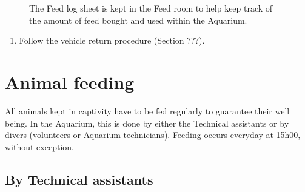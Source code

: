 \documentclass[
  12pt,
]{report}
\providecommand{\tightlist}{%
  \setlength{\itemsep}{0pt}\setlength{\parskip}{0pt}}\usepackage{longtable,booktabs,array}
\begin{document}
\begin{figure}[H]

\begin{minipage}[t]{0.50\linewidth}

{\centering 


}

\end{minipage}%
%
\begin{minipage}[t]{0.50\linewidth}

{\centering 


}

\end{minipage}%

\caption{\label{fig-feed-track}The Feed log sheet is kept in the Feed
room to help keep track of the amount of feed bought and used within the
Aquarium.}

\end{figure}

\begin{enumerate}
\def\labelenumi{\arabic{enumi}.}
\setcounter{enumi}{20}
\tightlist
\item
  Follow the vehicle return procedure (Section ???).
\end{enumerate}

\hypertarget{animal-feeding}{%
\section{Animal feeding}\label{animal-feeding}}

All animals kept in captivity have to be fed regularly to guarantee
their well being. In the Aquarium, this is done by either the Technical
assistants or by divers (volunteers or Aquarium technicians). Feeding
occurs everyday at 15h00, without exception.

\hypertarget{by-technical-assistants}{%
\subsection{By Technical assistants}\label{by-technical-assistants}}
\end{document}
